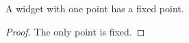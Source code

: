 \begin{proposition}\label{sy-999A}
A widget with one point has a fixed point.
\end{proposition}
\begin{proof}
The only point is fixed.
\end{proof}
